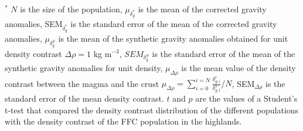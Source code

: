 \begin{table}[h!]
{\begin{tabular}
{\begin{minipage}{18cm}
                                    \vspace{.1cm}  \footnotesize  $^*$
                                    $N$ is the size of the population,
                                    $\mu_{\delta_g^*}$ is  the mean of
                                    the  corrected gravity  anomalies,
                                    SEM$_{\delta_g^*}$ is the standard
                                    error of the mean of the corrected
                                    gravity                 anomalies,
                                    $\mu_{\delta_g^S}$ is  the mean of
                                    the  synthetic  gravity  anomalies
                                    obtained for unit density contrast
                                    $\Delta  \rho  = 1$  kg  m$^{-3}$,
                                    $SEM_{\delta_g^S}$ is the standard
                                    error of the mean of the synthetic
                                    gravity    anomalies   for    unit
                                    density,  $\mu_{\Delta  \rho}$  is
                                    the  mean  value  of  the  density
                                    contrast between the magma and the
                                    crust
                                    $\mu_{\Delta                \rho}=
                                    \sum_{i=0}^{i=N}
                                    \frac{\delta_{g;i}^{c}}{\delta_{g;i}^{s}}/N$,
                                    SEM$_{\Delta   {\rho}}$   is   the
                                    standard error of the mean density
                                    contrast.   $t$  and $p$  are  the
                                    values of a  Student's t-test that
                                    compared   the  density   contrast
                                    distribution   of  the   different
                                    populations   with   the   density
                                    contrast of the  FFC population in
                                    the highlands.
                                  \end{minipage}
                                  }\\

                                \end{tabular}}
                                \label{Table4-3}
                              \end{table}
                              
